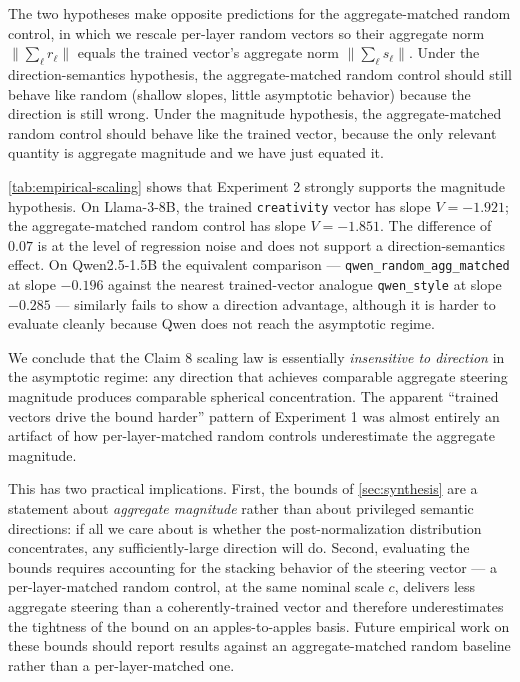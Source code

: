 The two hypotheses make opposite predictions for the aggregate-matched random control, in which we rescale per-layer random vectors so their aggregate norm $\|\sum_\ell r_\ell\|$ equals the trained vector's aggregate norm $\|\sum_\ell s_\ell\|$. Under the direction-semantics hypothesis, the aggregate-matched random control should still behave like random (shallow slopes, little asymptotic behavior) because the direction is still wrong. Under the magnitude hypothesis, the aggregate-matched random control should behave like the trained vector, because the only relevant quantity is aggregate magnitude and we have just equated it.

\ref{tab:empirical-scaling} shows that Experiment 2 strongly supports the magnitude hypothesis. On Llama-3-8B, the trained \texttt{creativity} vector has slope $V = -1.921$; the aggregate-matched random control has slope $V = -1.851$. The difference of $0.07$ is at the level of regression noise and does not support a direction-semantics effect. On Qwen2.5-1.5B the equivalent comparison --- \texttt{qwen\_random\_agg\_matched} at slope $-0.196$ against the nearest trained-vector analogue \texttt{qwen\_style} at slope $-0.285$ --- similarly fails to show a direction advantage, although it is harder to evaluate cleanly because Qwen does not reach the asymptotic regime.

We conclude that the Claim 8 scaling law is essentially \emph{insensitive to direction} in the asymptotic regime: any direction that achieves comparable aggregate steering magnitude produces comparable spherical concentration. The apparent ``trained vectors drive the bound harder'' pattern of Experiment 1 was almost entirely an artifact of how per-layer-matched random controls underestimate the aggregate magnitude.

This has two practical implications. First, the bounds of \ref{sec:synthesis} are a statement about \emph{aggregate magnitude} rather than about privileged semantic directions: if all we care about is whether the post-normalization distribution concentrates, any sufficiently-large direction will do. Second, evaluating the bounds requires accounting for the stacking behavior of the steering vector --- a per-layer-matched random control, at the same nominal scale $c$, delivers less aggregate steering than a coherently-trained vector and therefore underestimates the tightness of the bound on an apples-to-apples basis. Future empirical work on these bounds should report results against an aggregate-matched random baseline rather than a per-layer-matched one.

